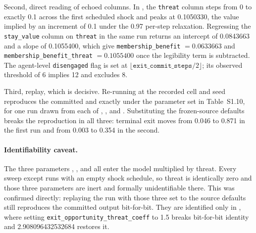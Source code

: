 \documentclass[12pt]{article}
\begin{document}
Second, direct reading of echoed columns. In , the
\texttt{threat} column steps from 0 to exactly 0.1 across the first scheduled
shock and peaks at 0.1050330, the value implied by an increment of 0.1 under the
0.97 per-step relaxation. Regressing the \texttt{stay\_value} column on
\texttt{threat} in the same run returns an intercept of 0.0843663 and a slope of
0.1055400, which give \texttt{membership\_benefit} $=0.0633663$ and
\texttt{membership\_benefit\_threat} $=0.1055400$ once the legibility term is
subtracted. The agent-level \texttt{disengaged} flag is set at
$\lfloor\texttt{exit\_commit\_steps}/2\rfloor$; its observed threshold of 6
implies 12 and excludes 8.

Third, replay, which is decisive. Re-running
 at the recorded cell and seed
reproduces the committed  and  exactly
under the parameter set in Table~S1.10, for one run drawn from each of
, , and
. Substituting the frozen-source defaults breaks
the reproduction in all three: terminal exit moves from 0.046 to 0.871 in the
first run and from 0.003 to 0.354 in the second.

\paragraph{Identifiability caveat.}
The three parameters ,
, and
 all enter the model multiplied by threat.
Every sweep except  runs with an empty shock
schedule, so threat is identically zero and those three parameters are inert and
formally unidentifiable there. This was confirmed directly: replaying the
 run with those three set to the source
defaults still reproduces the committed output bit-for-bit. They are identified
only in , where setting
\texttt{exit\_opportunity\_threat\_coeff} to 1.5 breaks bit-for-bit identity and
2.908096432532684 restores it.
\end{document}
